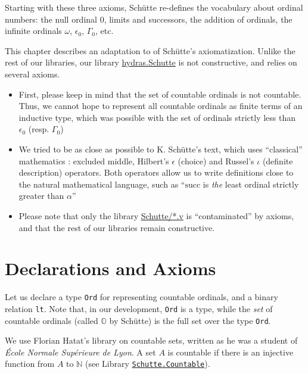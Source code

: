 Starting with these three axioms, Schütte re-defines the vocabulary about ordinal numbers: the null ordinal $0$, limits and successors, the addition of ordinals, the infinite ordinals $\omega$, $\epsilon_0$, $\Gamma_0$, etc.

This chapter describes an adaptation to \coq{} of Schütte's axiomatization. 
 Unlike the rest of our libraries, our library
\href{../theories/html/hydras.Schutte.Schutte.html}{hydras.Schutte}
is not constructive, and relies on several axioms.

\begin{itemize}
\item First, please keep in mind  that the set of countable ordinals is not countable. Thus, we cannot hope to represent all countable ordinals as finite terms of an inductive type, which was possible with  the set of ordinals strictly less than $\epsilon_0$ (resp. $\Gamma_0$)
\item We tried to be as close as possible to K. Schütte's text, which uses ``classical'' mathematics : excluded middle, Hilbert's $\epsilon$ (choice) and Russel's $\iota$ (definite description) operators. Both operators allow us to write definitions close to the natural mathematical language, such as ``$\textrm{succ}$ is \emph{the} least ordinal strictly greater than $\alpha$''
\item Please note that only the library \href{../theories/html/hydras.Schutte.Schutte.html}{Schutte/*.v} is ``contaminated'' by axioms, and that the rest of our libraries remain constructive.
\end{itemize}

\section{Declarations and Axioms}

Let us declare a type 
\texttt{Ord} for representing countable ordinals, and a binary relation
 \texttt{lt}. Note that, in our development, \texttt{Ord} is a type, while the \emph{set} of countable ordinals (called $\mathbb{O}$ by Schütte) 
is the full set over the type \texttt{Ord}.

\label{types:Ord} 

We use Florian Hatat's library on countable sets, written as he was a student of  \emph{\'Ecole Normale Supérieure de Lyon}. A set $A$ is countable if there is an injective function from $A$ to $\mathbb{N}$ (see 
Library \href{../theories/html/hydras.Schutte.Countable.html}%
{\texttt{Schutte.Countable}}).


